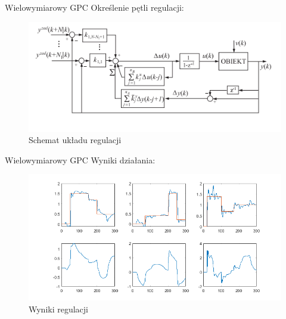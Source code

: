 \begin{frame}{Wielowymiarowy GPC}
Określenie pętli regulacji:
	\begin{center}
		\begin{figure}[H]
            		\includegraphics[scale=0.7]{images/SISOGPC.png}
          			 \caption{Schemat układu regulacji}
		\end{figure}
	\end{center}
\end{frame}

\begin{frame}{Wielowymiarowy GPC}
Wyniki działania:
	\begin{center}
		\begin{figure}[H]
            		\includegraphics[scale=0.5]{images/PID_wyniki.png} %
          			 \caption{Wyniki regulacji}
		\end{figure}
	\end{center}
\end{frame}
